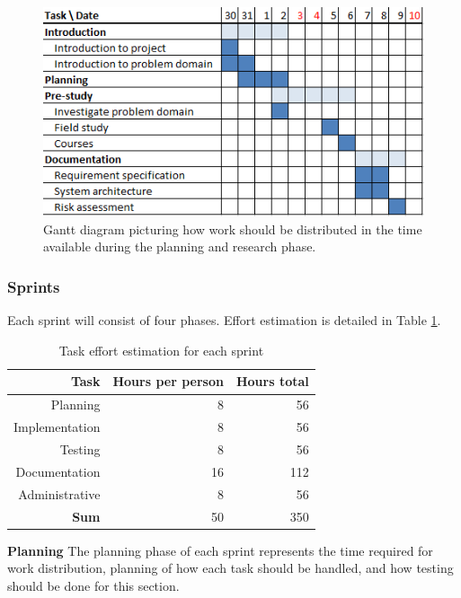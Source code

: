 \begin{figure}[h]
\centering
  \includegraphics[width=1.0\textwidth]{project_management/pre_implementation_gantt}
  \caption[Gantt chart of planning and research phase]{Gantt diagram picturing how work should be distributed in the time available during the planning and research phase.}
  \label{gantt:pre_imp}
\end{figure}

\subsubsection{Sprints}

Each sprint will consist of four phases. Effort estimation is
detailed in Table \ref{Sprint effort estimation}.

\begin{table}[htbp]
\begin{center}
  \begin{tabular}{|r|r|r|}
    \hline
    \bf{Task} & \bf{Hours per person} & \bf{Hours total} \\
    \hline
    Planning & 8 & 56 \\
    Implementation & 8 & 56 \\
    Testing & 8 & 56 \\
    Documentation & 16 & 112 \\
    Administrative & 8 & 56 \\
    \hline \hline
    \bf{Sum} & 50 & 350 \\
    \hline
  \end{tabular}
  \caption{Task effort estimation for each sprint}
  \label{Sprint effort estimation}
\end{center}
\end{table}

\textbf{Planning} The planning phase of each sprint represents the time
required for work distribution, planning of how each task should be handled,
and how testing should be done for this section.

